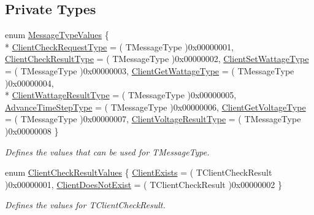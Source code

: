 \subsection*{Private Types}
\begin{DoxyCompactItemize}
\item 
enum \hyperlink{class_matlab_manager_afc23406cdfc3be02850cb0ebfff31667}{Message\-Type\-Values} \{ \\*
\hyperlink{class_matlab_manager_afc23406cdfc3be02850cb0ebfff31667adcbf0e0a9cff329e02fee0497abfa0ad}{Client\-Check\-Request\-Type} = ( T\-Message\-Type )0x00000001, 
\hyperlink{class_matlab_manager_afc23406cdfc3be02850cb0ebfff31667a6de37f5f7bc415439f9bfac3d388134e}{Client\-Check\-Result\-Type} = ( T\-Message\-Type )0x00000002, 
\hyperlink{class_matlab_manager_afc23406cdfc3be02850cb0ebfff31667acb00c176bba6ee9a2fba061b06b66d51}{Client\-Set\-Wattage\-Type} = ( T\-Message\-Type )0x00000003, 
\hyperlink{class_matlab_manager_afc23406cdfc3be02850cb0ebfff31667a48753b1473148776d411382a2a691da3}{Client\-Get\-Wattage\-Type} = ( T\-Message\-Type )0x00000004, 
\\*
\hyperlink{class_matlab_manager_afc23406cdfc3be02850cb0ebfff31667abc777d9922513b94f1cf1541a83ada1a}{Client\-Wattage\-Result\-Type} = ( T\-Message\-Type )0x00000005, 
\hyperlink{class_matlab_manager_afc23406cdfc3be02850cb0ebfff31667aa4d88f91b01fbcea0365103defc963f2}{Advance\-Time\-Step\-Type} = ( T\-Message\-Type )0x00000006, 
\hyperlink{class_matlab_manager_afc23406cdfc3be02850cb0ebfff31667a665fee7de60985960737ee5508d8c3ca}{Client\-Get\-Voltage\-Type} = ( T\-Message\-Type )0x00000007, 
\hyperlink{class_matlab_manager_afc23406cdfc3be02850cb0ebfff31667aaead7562933ee6468343ba41654b2c18}{Client\-Voltage\-Result\-Type} = ( T\-Message\-Type )0x00000008
 \}
\begin{DoxyCompactList}\small\item\em Defines the values that can be used for T\-Message\-Type. \end{DoxyCompactList}\item 
enum \hyperlink{class_matlab_manager_a3030ee8380a9c54563d3ba494b2ac5bd}{Client\-Check\-Result\-Values} \{ \hyperlink{class_matlab_manager_a3030ee8380a9c54563d3ba494b2ac5bdaee007d7e72b359f645f0f48f11270826}{Client\-Exists} = ( T\-Client\-Check\-Result )0x00000001, 
\hyperlink{class_matlab_manager_a3030ee8380a9c54563d3ba494b2ac5bda55075a8cc68c810028c410f20517f381}{Client\-Does\-Not\-Exist} = ( T\-Client\-Check\-Result )0x00000002
 \}
\begin{DoxyCompactList}\small\item\em Defines the values for T\-Client\-Check\-Result. \end{DoxyCompactList}\item 

\end{DoxyCompactItemize}

